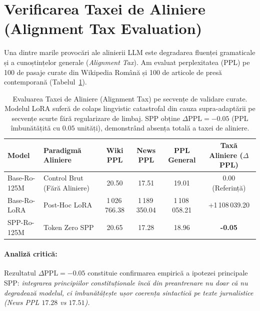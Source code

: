 \documentclass[11pt,a4paper]{article}
\begin{document}
\section{Verificarea Taxei de Aliniere (Alignment Tax Evaluation)}

Una dintre marile provocări ale alinierii LLM este degradarea fluenței gramaticale și a cunoștințelor generale (\textit{Alignment Tax}). Am evaluat perplexitatea (PPL) pe 100 de pasaje curate din Wikipedia Română și 100 de articole de presă contemporană (Tabelul~\ref{tab:thesis_alignment_tax}).

\begin{table}[htbp]
\centering
\small
\begin{tabular}{l l c c c c}
\toprule
\textbf{Model} & \textbf{Paradigmă Aliniere} & \textbf{Wiki PPL} & \textbf{News PPL} & \textbf{PPL General} & \textbf{Taxă Aliniere ($\Delta$ PPL)} \\
\midrule
Base-Ro-125M & Control Brut (Fără Aliniere) & 20.50 & 17.51 & 19.01 & 0.00 (Referință) \\
Base-Ro-LoRA & Post-Hoc LoRA & 1\,026\,766.38 & 1\,189\,350.04 & 1\,108\,058.21 & +1\,108\,039.20 \\
SPP-Ro-125M & Token Zero SPP & 20.65 & 17.28 & 18.96 & \textbf{-0.05} \\
\bottomrule
\end{tabular}
\caption{Evaluarea Taxei de Aliniere (Alignment Tax) pe secvențe de validare curate. Modelul LoRA suferă de colaps lingvistic catastrofal din cauza supra-adaptării pe secvențe scurte fără regularizare de limbaj. SPP obține $\Delta\text{PPL} = -0.05$ (PPL îmbunătățită cu $0.05$ unități), demonstrând absența totală a taxei de aliniere.}
\label{tab:thesis_alignment_tax}
\end{table}

\paragraph{Analiză critică:} Rezultatul $\Delta\text{PPL} = -0.05$ constituie confirmarea empirică a ipotezei principale SPP: \textit{integrarea principiilor constituționale încă din preantrenare nu doar că nu degradează modelul, ci îmbunătățește ușor coerența sintactică pe texte jurnalistice (News PPL $17.28$ vs $17.51$).}

\end{document}
